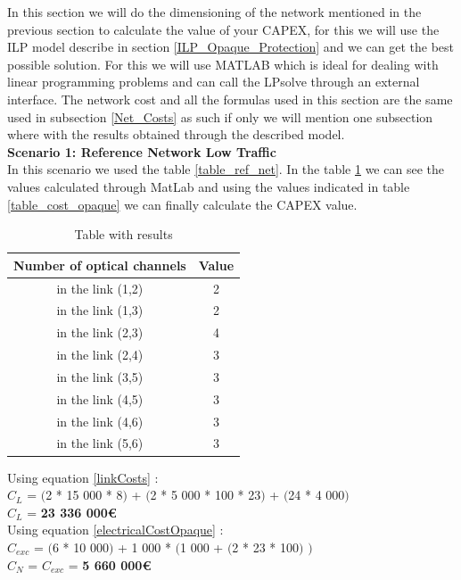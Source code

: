In this section we will do the dimensioning of the network mentioned in the previous section to calculate the value of your CAPEX, for this we will use the ILP model describe in section \ref{ILP_Opaque_Protection} and we can get the best possible solution.
For this we will use MATLAB which is ideal for dealing with linear programming problems and can call the LPsolve through an external interface.
The network cost and all the formulas used in this section are the same used in subsection \ref{Net_Costs} as such if only we will mention one subsection where with the results obtained through the described model.\\


\textbf{Scenario 1: Reference Network Low Traffic} \label{Scenario1_opaque_p} \\

In this scenario we used the table \ref{table_ref_net}. In the table \ref{result_ILP1_p} we can see the values calculated through MatLab and using the values indicated in table \ref{table_cost_opaque} we can finally calculate the CAPEX value.
\begin{table}[h!]
\centering
\begin{tabular}{|| c | c||}
 \hline
 Number of optical channels & Value \\
 \hline\hline
 in the link (1,2) & 2 \\
 in the link (1,3) & 2 \\
 in the link (2,3) & 4 \\
 in the link (2,4) & 3 \\
 in the link (3,5) & 3 \\
 in the link (4,5) & 3 \\
 in the link (4,6) & 3 \\
 in the link (5,6) & 3 \\
 \hline
\end{tabular}
\caption{Table with results}
\label{result_ILP1_p}
\end{table}

Using equation \ref{linkCosts} : \\
$C_L$ = $($2 * 15 000 * 8$)$ + $($2 * 5 000 * 100 * 23$)$ + $($24 * 4 000$)$ \\
$C_L$ = \textbf{23 336 000\euro} \\

Using equation \ref{electricalCostOpaque} : \\
$C_{exc}$ = $($6 * 10 000$)$ + 1 000 * $($1 000 + $($2 * 23 * 100$)$ $)$ \\
$C_N$ = $C_{exc}$ = \textbf{5 660 000\euro} \\


